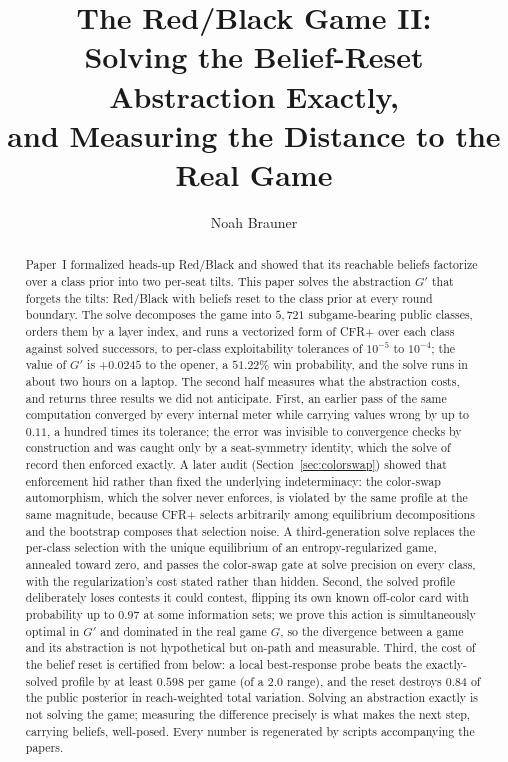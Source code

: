 \documentclass[11pt]{article}
\title{\bfseries The Red/Black Game II:\\[2pt]
       \large Solving the Belief-Reset Abstraction Exactly,\\
       and Measuring the Distance to the Real Game}
\author{Noah Brauner}
\date{}
\theoremstyle{plain}
\theoremstyle{definition}
\theoremstyle{remark}
\newcommand{\game}{\ensuremath{G}}
\newcommand{\gp}{\ensuremath{G'}}
\begin{document}
\maketitle
\vspace{-3.2em}

\begin{abstract}
\noindent
Paper~I formalized heads-up Red/Black and showed that its reachable
beliefs factorize over a class prior into two per-seat tilts. This paper
solves the abstraction $\gp$ that forgets the tilts: Red/Black
with beliefs reset to the class prior at every round boundary. The solve
decomposes the game into $5{,}721$ subgame-bearing public classes, orders
them by a layer index, and runs a vectorized form of CFR+ over each class
against solved successors, to per-class exploitability tolerances
of $10^{-5}$ to $10^{-4}$; the value of $\gp$ is $+0.0245$ to the opener,
a $51.22\%$ win probability, and the solve runs in about two hours on a
laptop. The second half measures what the abstraction costs, and returns
three results we did not anticipate. First, an earlier pass of the same
computation converged by every internal meter while carrying values wrong
by up to $0.11$, a hundred times its tolerance; the error was invisible
to convergence checks by construction and was caught only by a
seat-symmetry identity, which the solve of record then enforced exactly.
A later audit (Section~\ref{sec:colorswap}) showed that enforcement
hid rather than fixed the underlying indeterminacy: the color-swap
automorphism, which the solver never enforces, is violated by the same
profile at the same magnitude, because CFR+ selects arbitrarily among
equilibrium decompositions and the bootstrap composes that selection
noise. A third-generation solve replaces the per-class selection with
the unique equilibrium of an entropy-regularized game, annealed toward
zero, and passes the color-swap gate at solve precision on every
class, with the regularization's cost stated rather than hidden.
Second, the solved profile deliberately loses contests it could contest,
flipping its own known off-color card with probability up to $0.97$ at
some information sets; we prove this action is simultaneously optimal in
$\gp$ and dominated in the real game $\game$, so the divergence between a
game and its abstraction is not hypothetical but on-path and measurable.
Third, the cost of the belief reset is certified from below: a local
best-response probe beats the exactly-solved profile by at least $0.598$
per game (of a $2.0$ range), and the reset destroys $0.84$ of the public
posterior in reach-weighted total variation. Solving an abstraction
exactly is not solving the game; measuring the difference precisely is
what makes the next step, carrying beliefs, well-posed. Every number is
regenerated by scripts accompanying the papers.
\end{abstract}
\end{document}
